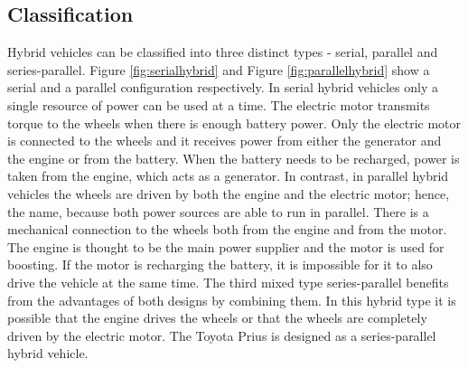 \subsection{Classification}
Hybrid vehicles can be classified into three distinct types - serial, parallel and series-parallel. Figure \ref{fig:serialhybrid} and Figure \ref{fig:parallelhybrid} show a serial and a parallel configuration respectively. In serial hybrid vehicles only a single resource of power can be used at a time. The electric motor transmits torque to the wheels when there is enough battery power. Only the electric motor is connected to the wheels and it receives power from either the generator and the engine or from the battery. When the battery needs to be recharged, power is taken from the engine, which acts as a generator. In contrast, in parallel hybrid vehicles the wheels are driven by both the engine and the electric motor; hence, the name, because both power sources are able to run in parallel. There is a mechanical connection to the wheels both from the engine and from the motor. The engine is thought to be the main power supplier and the motor is used for boosting. If the motor is recharging the battery, it is impossible for it to also drive the vehicle at the same time. The third mixed type series-parallel benefits from the advantages of both designs by combining them. In this hybrid type it is possible that the engine drives the wheels or that the wheels are completely driven by the electric motor. The Toyota Prius is designed as a series-parallel hybrid vehicle.


